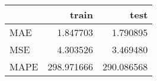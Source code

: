 \begin{tabular}{lrr}
\toprule
{} &       train &        test \\
\midrule
MAE  &    1.847703 &    1.790895 \\
MSE  &    4.303526 &    3.469480 \\
MAPE &  298.971666 &  290.086568 \\
\bottomrule
\end{tabular}
